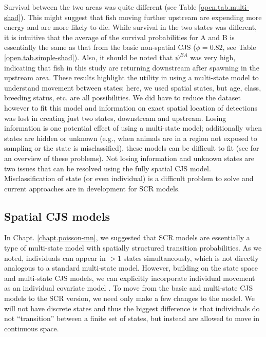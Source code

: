 Survival between the two areas was quite different (see Table
\ref{open.tab.multi-shad}).  This might suggest that fish moving
further upstream are expending more energy and are more likely to die.
While survival in the two states was different, it is intuitive that
the average of the survival probabilities for A and B is essentially
the same as that from the basic non-spatial CJS ($\phi = 0.82$, see
Table \ref{open.tab.simple-shad}).  Also, it should be noted that
$\psi^{BA}$ was very high, indicating that fish in this study are
returning downstream after spawning in the upstream area.  These
results highlight the utility in using a multi-state model to
understand movement between states; here, we used spatial states, but
age, class, breeding status, etc. are all possibilities.  We did have
to reduce the  
dataset however to fit this model and information on exact spatial location of detections
was lost in creating just two states, downstream and upstream.  Losing
information is one potential effect of using a multi-state model;
additionally when states are hidden or unknown (e.g., when animals are
in a region not exposed to sampling or the state is misclassified),
these models can be difficult to fit (see \citet{conn_cooch:2009} for
an overview of these problems).  Not losing information and unknown
states are two issues that can be resolved using the fully spatial CJS
model.  Misclassification of state (or even individual) is a difficult
problem to solve and current approaches \citep{link_etal:2010,
  mcclintock_etal:inpress} are in development for SCR models.  



\subsection{Spatial CJS models}

In Chapt. \ref{chapt.poisson-mn}, we suggested that SCR models are 
essentially a type of multi-state model with spatially structured
transition probabilities.  As we noted, individuals can appear in $>1$
states simultaneously, which is not directly analogous to a standard
multi-state model.  However, building on the state space and
multi-state CJS models, we can explicitly incorporate individual
movement as an individual covariate model \citep{royle_indcov:2007}.
To move from the basic and multi-state CJS models to the SCR version,
we need only make a few changes to the model.  We will
not have discrete states and thus the biggest difference is that
individuals do not ``transition'' between a finite set of states, but
instead are allowed to move in continuous space.

